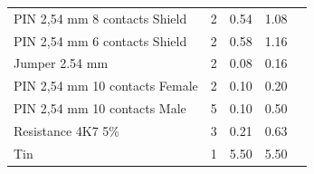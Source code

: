 \begin{table}[H]
{\begin{turn}{90}
\begin{tabular}{|l|l|l|l|l}
		PIN 2,54 mm 8 contacts Shield                          & 2                                         & 0.54                                                                                                                & 1.08                                                                                                             &  \\ \cline{1-4}
		PIN 2,54 mm 6 contacts Shield                          & 2                                         & 0.58                                                                                                                & 1.16                                                                                                             &  \\ \cline{1-4}
		Jumper 2.54 mm                               & 2                                         & 0.08                                                                                                                & 0.16                                                                                                             &  \\ \cline{1-4}
		PIN 2,54 mm 10 contacts Female                         & 2                                         & 0.10                                                                                                                & 0.20                                                                                                             &  \\ \cline{1-4}
		PIN 2,54 mm 10 contacts Male                          & 5                                         & 0.10                                                                                                                & 0.50                                                                                                             &  \\ \cline{1-4}
		Resistance 4K7 5\%                                             & 3                                         & 0.21                                                                                                                & 0.63                                                                                                             &  \\ \cline{1-4}
		Tin                                                          & 1                                         & 5.50                                                                                                                & 5.50                                                                                                             &  \\ \cline{1-4}

\end{tabular}
\end{turn}}
\end{table}
